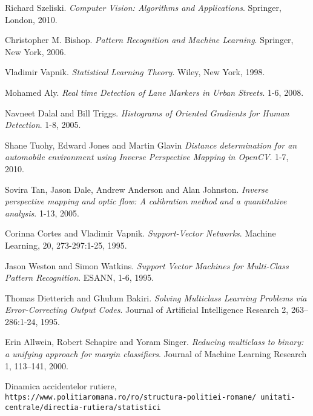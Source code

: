 \begin{thebibliography}{9}
	Richard Szeliski. 
	\textit{Computer Vision: Algorithms and Applications}. 
	Springer, London, 2010.
	
	Christopher M. Bishop. 
	\textit{Pattern Recognition and Machine Learning}. 
	Springer, New York, 2006.
	
	Vladimir Vapnik. 
	\textit{Statistical Learning Theory}. 
	Wiley, New York, 1998.
	
	Mohamed Aly.
	\textit{Real time Detection of Lane Markers in Urban Streets}.
	1-6, 2008.
		
	Navneet Dalal and Bill Triggs. 
	\textit{Histograms of Oriented Gradients for Human Detection}.
	1-8, 2005.
	
	Shane Tuohy, Edward Jones and Martin Glavin
	\textit{Distance determination for an automobile environment using Inverse Perspective Mapping in OpenCV}.
	1-7, 2010.

	Sovira Tan, Jason Dale, Andrew Anderson and Alan Johnston.
	\textit{Inverse perspective mapping and optic flow: A calibration method and a quantitative analysis}.
	1-13, 2005.
	
	Corinna Cortes and Vladimir Vapnik.
	\textit{Support-Vector Networks}.
	Machine Learning, 20, 273-297:1-25, 1995.
	
	Jason Weston and Simon Watkins.
	\textit{Support Vector Machines for Multi-Class Pattern Recognition}.
	ESANN, 1-6, 1995.
	
	Thomas Dietterich and Ghulum Bakiri.
	\textit{Solving Multiclass Learning Problems via Error-Correcting Output Codes}.
	Journal of Artificial Intelligence Research 2, 263–286:1-24, 1995.
	
	Erin Allwein, Robert Schapire and Yoram Singer.
	\textit{Reducing multiclass to binary: a unifying approach for margin classifiers}.
	Journal of Machine Learning Research 1, 113–141, 2000.
	
	Dinamica accidentelor rutiere,
	\\\texttt{https://www.politiaromana.ro/ro/structura-politiei-romane/
		unitati-centrale/directia-rutiera/statistici}
\end{thebibliography}